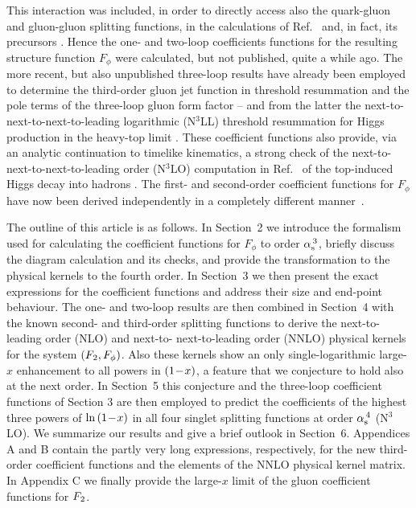 \documentclass[12pt]{article}
\newcommand{\as}{\alpha_{\rm s}}
\begin{document}
This interaction was included, in order to directly access also the quark-gluon
and gluon-gluon splitting functions, in the calculations of Ref.~\cite{MVV4} 
and, in fact, its precursors \cite{Mom3loop,Moch:1999eb}.
Hence the one- and two-loop coefficients functions for the resulting structure 
function $F_\phi$ were calculated, but not published, quite a while ago. 
The more recent, but also unpublished three-loop results have already been 
employed to determine the third-order gluon jet function in threshold 
resummation \cite{MVV7} and the pole terms of the three-loop gluon form factor
\cite{MVV9} -- and from the latter the next-to-next-to-next-to-leading 
logarithmic (N$^3$LL) threshold resummation for Higgs production in the 
heavy-top limit \cite{MV1}.
These coefficient functions also provide, via an analytic continuation to 
timelike kinematics, a strong check of the next-to-next-to-next-to-leading 
order (N$^3$LO) computation in Ref.~\cite{Baikov:2006ch} of the top-induced
Higgs decay into hadrons \cite{MV2}. The first- and second-order coefficient 
functions for $F_\phi$ have now been derived independently in a completely 
different manner~\cite{DGGLcphi}.

The outline of this article is as follows. In Section~2 we introduce the 
formalism used for calculating the coefficient functions for $F_\phi$ to order 
$\as^{\,3}$, briefly discuss the diagram calculation and its checks, and 
provide the transformation to the physical kernels to the fourth order. 
In Section~3 we then present the exact expressions for the coefficient 
functions and address their size and end-point behaviour. The one- and two-loop
results are then combined in Section~4 with the known second- and third-order
splitting functions to derive the next-to-leading order (NLO) and next-to-%
next-to-leading order (NNLO) physical kernels for the system $({F_{\:\! 2}},F_\phi)$.
Also these kernels show an only single-logarithmic large-$x$ enhancement to all
powers in $\x1$, a feature that we conjecture to hold also at the next order.
In Section~5 this conjecture and the three-loop coefficient functions of 
Section 3 are then employed to predict the coefficients of the highest three 
powers of $\ln \x1$ in all four singlet splitting functions at order 
$\as^{\,4}$ (N$^3$LO).
We summarize our results and give a brief outlook in Section~6. 
Appendices A and B contain the partly very long expressions, respectively, 
for the new third-order coefficient functions and the elements of the NNLO 
physical kernel matrix. In Appendix C we finally provide the large-$x$ limit of
the gluon coefficient functions for ${F_{\:\! 2}}$. 
%
%
\end{document}
